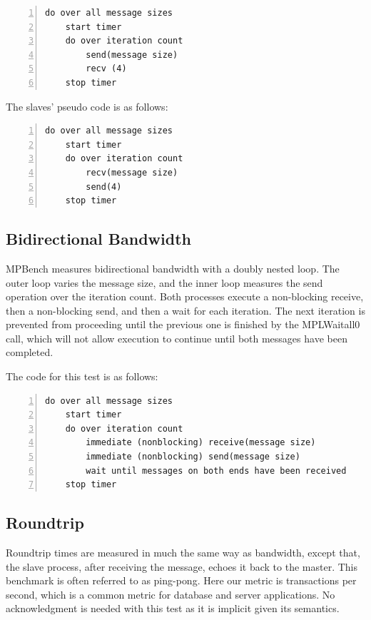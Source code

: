 \begin{lstlisting}[frame=single,numbers=left]
do over all message sizes 
    start timer
    do over iteration count 
        send(message size) 
        recv (4)
    stop timer
\end{lstlisting}

The slaves' pseudo code is as follows:

\begin{lstlisting}[frame=single,numbers=left]
do over all message sizes 
    start timer
    do over iteration count 
        recv(message size) 
        send(4)
    stop timer
\end{lstlisting}

\subsection{Bidirectional Bandwidth}

MPBench measures bidirectional bandwidth with a doubly nested loop. The outer
loop varies the message size, and the inner loop measures the send operation
over the iteration count. Both processes execute a non-blocking receive, then a
non-blocking send, and then a wait for each iteration. The next iteration is
prevented from proceeding until the previous one is finished by the MPLWaitall0
call, which will not allow execution to continue until both messages have been
completed.

The code for this test is as follows:
 
\begin{lstlisting}[frame=single,numbers=left]
 do over all message sizes
    start timer
    do over iteration count
        immediate (nonblocking) receive(message size)
        immediate (nonblocking) send(message size)
        wait until messages on both ends have been received
    stop timer
\end{lstlisting}


\subsection{Roundtrip}

Roundtrip times are measured in much the same way as bandwidth, except that,
the slave process, after receiving the message, echoes it back to the master.
This benchmark is often referred to as ping-pong. Here our metric is
transactions per second, which is a common metric for database and server
applications. No acknowledgment is needed with this test as it is implicit
given its semantics.

